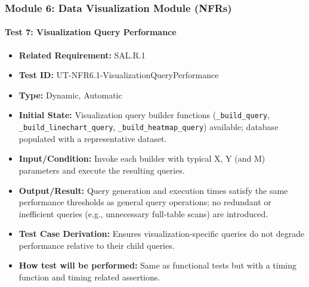 \documentclass[12pt, titlepage]{article}
\begin{document}
\begin{flushleft}
\subsubsection{Module 6: Data Visualization Module (NFRs)}

\paragraph{Test 7: Visualization Query Performance}
\begin{itemize}
    \item \textbf{Related Requirement:} SAL.R.1
    \item \textbf{Test ID:} UT-NFR6.1-VisualizationQueryPerformance
    \item \textbf{Type:} Dynamic, Automatic
    \item \textbf{Initial State:} Visualization query builder functions (\texttt{\_build\_query}, \texttt{\_build\_linechart\_query}, \texttt{\_build\_heatmap\_query}) available; database populated with a representative dataset.
    \item \textbf{Input/Condition:} Invoke each builder with typical X, Y (and M) parameters and execute the resulting queries.
    \item \textbf{Output/Result:} Query generation and execution times satisfy the same performance thresholds as general query operations; no redundant or inefficient queries (e.g., unnecessary full-table scans) are introduced.
    \item \textbf{Test Case Derivation:} Ensures visualization-specific queries do not degrade performance relative to their child queries.
    \item \textbf{How test will be performed:} Same as functional tests but with a timing function and timing related assertions.
\end{itemize}


\end{flushleft}
\end{document}
